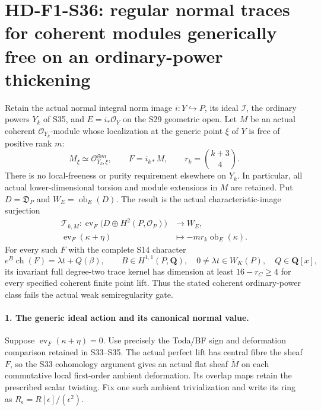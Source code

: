 \section[HD-F1-S36: coherent modules on ordinary powers]{HD-F1-S36: regular normal traces for coherent modules generically free on an ordinary-power thickening}
\label{sec:f1-norm-fourfold-generically-free-powers}

Retain the actual normal integral norm image
$i:Y\hookrightarrow P$, its ideal $\mathcal I$,
the ordinary powers $Y_k$ of S35, and
$E=i_*\mathcal O_Y$ on the S29 geometric open.
Let $M$ be an actual coherent $\mathcal O_{Y_k}$-module
whose localization at the generic point $\xi$ of $Y$
is free of positive rank $m$:
\[
 M_\xi\simeq\mathcal O_{Y_k,\xi}^{\oplus m},
 \qquad F=i_{k*}M,\qquad r_k=\binom{k+3}{4}.
 \tag{F1S36.1}
\]
There is no local-freeness or purity requirement
elsewhere on $Y_k$. In particular, all actual
lower-dimensional torsion and module extensions
in $M$ are retained.
Put $D=\mathfrak D_P$ and
$W_E=\operatorname{ob}_E(D)$.
The result is the actual characteristic-image
surjection
\[
\begin{split}
 \mathcal T_{k,M}:
 \operatorname{ev}_F\bigl(D\oplus H^2(P,\mathcal O_P)\bigr)
 &\longrightarrow W_E,\\
 \operatorname{ev}_F(\kappa+\eta)
 &\longmapsto -m r_k\operatorname{ob}_E(\kappa).
\end{split}
 \tag{F1S36.2}
\]
For every such $F$ with the complete S14 character
\[
 e^B\operatorname{ch}(F)=\lambda t+Q(\beta),
 \qquad B\in H^{1,1}(P,\mathbf Q),\quad
 0\ne\lambda t\in W_K(P),\quad Q\in\mathbf Q[x],
 \tag{F1S36.3}
\]
its invariant full degree-two trace kernel has
dimension at least $16-r_C\ge4$ for every specified
coherent finite point lift. Thus the stated
coherent ordinary-power class fails the actual
weak semiregularity gate.

\paragraph{1. The generic ideal action and its canonical normal value.}
Suppose $\operatorname{ev}_F(\kappa+\eta)=0$.
Use precisely the Toda/BF sign and deformation
comparison retained in S33--S35. The actual
perfect lift has central fibre the sheaf $F$,
so the S33 cohomology argument gives an actual
flat sheaf $\widetilde M$ on each commutative
local first-order ambient deformation. Its
overlap maps retain the prescribed scalar
twisting. Fix one such ambient trivialization
and write its ring as $R_\epsilon=R[\epsilon]/(\epsilon^2)$.

